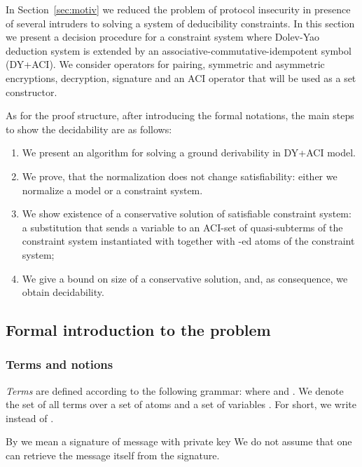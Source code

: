 
In Section~\ref{sec:motiv} we reduced the  problem of protocol  insecurity in presence of several intruders 
to solving  a system of deducibility constraints. 
In this section we present a decision procedure for a constraint system where  
Dolev-Yao deduction system is extended by an associative-commutative-idempotent symbol (DY+ACI).
We consider operators for pairing, symmetric and asymmetric encryptions, decryption, signature 
and an  ACI operator that will be used as a set constructor.


As for the proof structure, after  introducing the formal notations, the main steps to show the decidability are as follows:
\begin{enumerate}
 \item We present an algorithm for solving a ground derivability in DY+ACI model.
 \item We prove, that the normalization does not change satisfiability: either we normalize a model or a constraint system.
 \item We show existence of a conservative solution of satisfiable constraint system: a substitution  that sends a variable to an ACI-set of quasi-subterms of the constraint system instantiated with  
  together with -ed atoms of the constraint system;
 \item We give a bound on size of a conservative solution, and, as consequence, we obtain decidability.
\end{enumerate}

\subsection{Formal introduction to the problem}

\subsubsection{Terms and notions}\label{subs:def2}



\begin{df}\label{def:term}
\emph{Terms}  are defined according to the following grammar:
\LONG{
 
}\SHORT{
 
}where
 and
.
 We denote  the set of all terms over 
a set of atoms  and a set of variables . 
For short, we write  instead of .

\end{df}

By  we mean a signature of message  with private key  
We do not assume that one can retrieve the  message itself from the signature.

